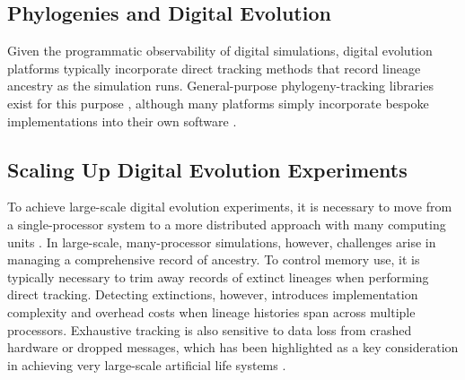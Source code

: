 
\subsection{Phylogenies and Digital Evolution} \label{sec:introduction:digital}


Given the programmatic observability of digital simulations, digital evolution platforms typically incorporate direct tracking methods that record lineage ancestry as the simulation runs.
General-purpose phylogeny-tracking libraries exist for this purpose \citep{dolson2024phylotrack}, although many platforms simply incorporate bespoke implementations into their own software \citep{ofria2004avida}.

\subsection{Scaling Up Digital Evolution Experiments} \label{sec:introduction:distributed}

To achieve large-scale digital evolution experiments, it is necessary to move from a single-processor system to a more distributed approach with many computing units \citep{moreno2024trackable}.
In large-scale, many-processor simulations, however, challenges arise in managing a comprehensive record of ancestry.
To control memory use, it is typically necessary to trim away records of extinct lineages when performing direct tracking.
Detecting extinctions, however, introduces implementation complexity and overhead costs when lineage histories span across multiple processors.
Exhaustive tracking is also sensitive to data loss from crashed hardware or dropped messages, which has been highlighted as a key consideration in achieving very large-scale artificial life systems \citep{ackley2016indefinite,ackley2014indefinitely}.

